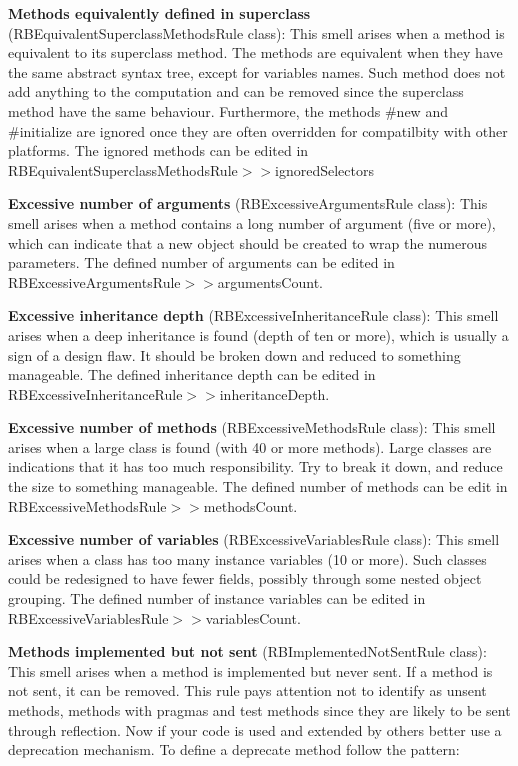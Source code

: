 \textbf{Methods equivalently defined in superclass} (RBEquivalentSuperclassMethodsRule class): This smell arises when a method is equivalent to its superclass method. The methods are equivalent when they have the same abstract syntax tree, except for variables names. Such method does not add anything to the computation and can be removed since the superclass method have the same behaviour. Furthermore, the methods \#new and \#initialize are ignored once they are often overridden for compatilbity with other platforms. The ignored methods can be edited in RBEquivalentSuperclassMethodsRule$>>$ignoredSelectors

\textbf{Excessive number of arguments} (RBExcessiveArgumentsRule class): This smell arises when a method contains a long number of argument (five or more), which can indicate that a new object should be created to wrap the numerous parameters. The defined number of arguments can be edited in RBExcessiveArgumentsRule$>>$argumentsCount.

\textbf{Excessive inheritance depth} (RBExcessiveInheritanceRule class): This smell arises when a deep inheritance is found (depth of ten or more), which is usually a sign of a design flaw. It should be broken down and reduced to something manageable. The defined inheritance depth can be edited in RBExcessiveInheritanceRule$>>$inheritanceDepth.

\textbf{Excessive number of methods} (RBExcessiveMethodsRule class): This smell arises when a large class is found (with 40 or more methods). Large classes are indications that it has too much responsibility. Try to break it down, and reduce the size to something manageable. The defined number of methods can be edit in RBExcessiveMethodsRule$>>$methodsCount.

\textbf{Excessive number of variables} (RBExcessiveVariablesRule class): This smell arises when a class has too many instance variables (10 or more). Such classes could be redesigned to have fewer fields, possibly through some nested object grouping. The defined number of instance variables can be edited in RBExcessiveVariablesRule$>>$variablesCount.

\textbf{Methods implemented but not sent} (RBImplementedNotSentRule class): This smell arises when a method is implemented but never sent. If a method is not sent, it can be removed. This rule pays attention not to identify as unsent methods, methods with pragmas and test methods since they are likely to be sent through reflection.
	Now if your code is used and extended by others better use a deprecation mechanism. To define a deprecate method follow the pattern: 
	
